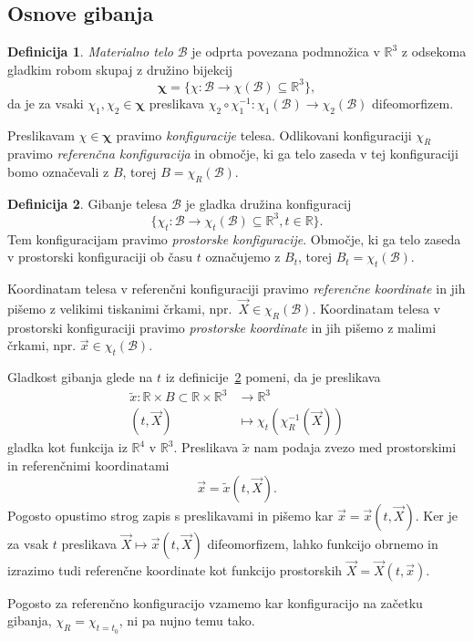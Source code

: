 \documentclass[12pt,a4paper]{article}
\theoremstyle{definition} %
\newtheorem{definicija}{Definicija}[section]
\theoremstyle{plain} %
\numberwithin{equation}{section}
\newcommand{\R}{\mathbb R}
\newcommand{\B}{\mathcal{B}}
\renewcommand{\b}{\boldsymbol}
\newcommand{\vX}{\vec{X}}
\newcommand{\vx}{\vec{x}}
\begin{document}
\subsection{Osnove gibanja}

\begin{definicija}
  \emph{Materialno telo} $\B$ je odprta povezana podmnožica v $\R^3$ z odsekoma gladkim
  robom skupaj z družino bijekcij
  \[
    \b\chi = \{\chi \colon\B\to\chi(\B) \subseteq \R^3\},
  \]
  da je za vsaki $\chi_1, \chi_2 \in \b\chi$ preslikava
  $\chi_2\circ\chi_1^{-1}\colon \chi_1(\B) \to \chi_2(\B)$
  difeomorfizem.

  Preslikavam $\chi \in \b\chi$ pravimo \emph{konfiguracije} telesa. Odlikovani
  konfiguraciji $\chi_R$ pravimo \emph{referenčna konfiguracija} in območje, ki
  ga telo zaseda v tej konfiguraciji bomo označevali z $B$, torej $B =
  \chi_R(\B)$.
\end{definicija}

\begin{definicija}
  \label{def:gibanje}
  Gibanje telesa $\B$ je gladka družina konfiguracij
  \[
    \{\chi_t\colon \B \to\chi_t(\B) \subseteq \R^3, t \in \R\}.
  \]
  Tem konfiguracijam pravimo \emph{prostorske konfiguracije}. Območje, ki ga
  telo zaseda v prostorski konfiguraciji ob času $t$ označujemo z $B_t$, torej
  $B_t = \chi_t(\B)$.
\end{definicija}
Koordinatam telesa v referenčni konfiguraciji pravimo \emph{referenčne
koordinate} in jih pišemo z velikimi tiskanimi črkami, npr.\ $\vX \in \chi_R(\B)$.
Koordinatam telesa v prostorski konfiguraciji pravimo \emph{prostorske
koordinate} in jih pišemo z malimi črkami, npr. $\vx \in \chi_t(\B)$.

Gladkost gibanja glede na $t$ iz definicije~\ref{def:gibanje} pomeni, da je
preslikava
\begin{align*}
  \tilde{x}\colon \R \times B \subset \R \times \R^3&\to \R^3 \\
  (t, \vX) &\mapsto \chi_t(\chi_R^{-1}(\vX))
\end{align*}
gladka kot funkcija iz $\R^4$ v $\R^3$.
Preslikava $\tilde x$ nam podaja zvezo med prostorskimi in referenčnimi
koordinatami
\[
  \vx = \tilde x(t, \vX).
\]
Pogosto opustimo strog zapis s preslikavami in pišemo kar $\vx = \vx(t, \vX)$.
Ker je za vsak $t$ preslikava $\vX \mapsto \vx(t, \vX)$ difeomorfizem, lahko funkcijo
obrnemo in izrazimo tudi referenčne koordinate kot funkcijo prostorskih $\vX = \vX(t, \vx)$.

Pogosto za referenčno konfiguracijo vzamemo kar konfiguracijo na začetku
gibanja, $\chi_R = \chi_{t=t_0}$, ni pa nujno temu tako.
\end{document}
